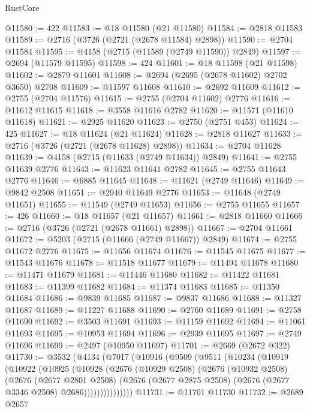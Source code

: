 \begin{lexlean}{RustCore}
\begin{coremodule}
@11580 := 422
@11583 := @18 @11580 (@21 @11580)
@11584 := @2818 @11583
@11589 := @2716 (@3726 (@2721 (@2678 @11584) @2898))
@11590 := @2704 @11584
@11595 := @4158 (@2715 (@11589 (@2749 @11590)) @2849)
@11597 := @2694 (@11579 @11595)
@11598 := 424
@11601 := @18 @11598 (@21 @11598)
@11602 := @2879 @11601
@11608 := @2694 (@2695 (@2678 @11602) @2702 @3650) @2708
@11609 := @11597 @11608
@11610 := @2692 @11609
@11612 := @2755 (@2704 @11576)
@11615 := @2755 (@2704 @11602) @2776
@11616 := @11612 @11615
@11618 := @3558 @11616 @2782
@11620 := @11571 (@11610 @11618)
@11621 := @2925 @11620
@11623 := @2750 (@2751 @453)
@11624 := 425
@11627 := @18 @11624 (@21 @11624)
@11628 := @2818 @11627
@11633 := @2716 (@3726 (@2721 (@2678 @11628) @2898))
@11634 := @2704 @11628
@11639 := @4158 (@2715 (@11633 (@2749 @11634)) @2849)
@11641 := @2755 @11639 @2776
@11643 := @11623 @11641 @2782
@11645 := @2755 @11643 @2776
@11646 := @6885 @11645
@11648 := @11621 (@2749 @11646)
@11649 := @9842 @2508
@11651 := @2940 @11649 @2776
@11653 := @11648 (@2749 @11651)
@11655 := @11549 (@2749 @11653)
@11656 := @2755 @11655
@11657 := 426
@11660 := @18 @11657 (@21 @11657)
@11661 := @2818 @11660
@11666 := @2716 (@3726 (@2721 (@2678 @11661) @2898))
@11667 := @2704 @11661
@11672 := @5203 (@2715 (@11666 (@2749 @11667)) @2849)
@11674 := @2755 @11672 @2776
@11675 := @11656 @11674
@11676 := @11545 @11675
@11677 := @11543 @11676
@11678 := @11518 @11677
@11679 := @11494 @11678
@11680 := @11471 @11679
@11681 := @11446 @11680
@11682 := @11422 @11681
@11683 := @11399 @11682
@11684 := @11374 @11683
@11685 := @11350 @11684
@11686 := @9839 @11685
@11687 := @9837 @11686
@11688 := @11327 @11687
@11689 := @11227 @11688
@11690 := @2760 @11689
@11691 := @2758 @11690
@11692 := @3503 @11691
@11693 := @11159 @11692
@11694 := @11061 @11693
@11695 := @10953 @11694
@11696 := @2939 @11695
@11697 := @2749 @11696
@11699 := @2497 (@10950 @11697)
@11701 := @2669 (@2672 @322)
@11730 := @3532
    (@4134
      (@7017
        (@10916
          (@9509
            (@9511
              (@10234
                (@10919
                  (@10922
                    (@10925
                      (@10928
                        (@2676
                          (@10929 @2508)
                          (@2676
                            (@10932 @2508)
                            (@2676
                              (@2677 @2801 @2508)
                              (@2676
                                (@2677 @2875 @2508)
                                (@2676 (@2677 @3346 @2508) @2686)))))))))))))))
@11731 := @11701 @11730
@11732 := @2689 @2657

\end{coremodule}
\end{lexlean}

